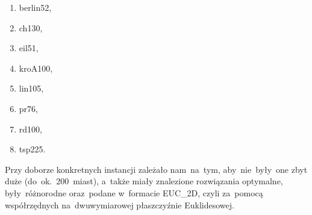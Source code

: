 \begin{enumerate}
    \item berlin52,
    \item ch130,
    \item eil51,
    \item kroA100,
    \item lin105,
    \item pr76,
    \item rd100,
    \item tsp225.
\end{enumerate}

\noindent
Przy doborze konkretnych instancji zależało nam~na~tym, aby~nie~były~one zbyt duże (do~ok.~200~miast), a~także miały znalezione rozwiązania optymalne, były~różnorodne oraz~podane w~formacie EUC\_2D, czyli za~pomocą współrzędnych na~dwuwymiarowej płaszczyźnie Euklidesowej.